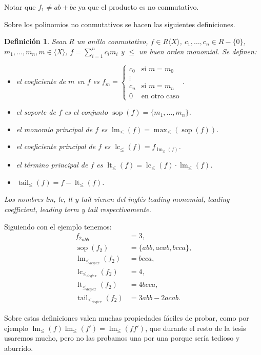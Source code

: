 \documentclass[12pt]{report}
\theoremstyle{customstyle}
\newtheorem{definition}[theorem]{Definición}
\theoremstyle{factstyle}
\DeclareMathOperator{\sop}{sop}
\DeclareMathOperator{\lm}{lm}
\DeclareMathOperator{\lc}{lc}
\DeclareMathOperator{\lt}{lt}
\DeclareMathOperator{\tail}{tail}
\begin{document}
\noindent Notar que $f_1 ≠ ab + bc$ ya que el producto es no conmutativo.

Sobre los polinomios no conmutativos se hacen las siguientes definiciones.

\begin{definition}\label{def:cosas de polinomios}
  Sean $R$ un anillo conmutativo, $f ∈ R⟨X⟩$, $c_1, …, c_n ∈ R - \{0\}$, $m_1, …, m_n, m ∈ ⟨X⟩$, $f = ∑_{i = 1}^n c_i m_i$ y $≤$ un buen orden monomial. Se definen:
  \begin{itemize}
    \item el coeficiente de $m$ en $f$ es $f_m = \begin{cases} c_0&\text{si }m = m_0 \\ ⋮ & \\ c_n&\text{si }m = m_n \\ 0&\text{en otro caso} \end{cases} $.
    \item el soporte de $f$ es el conjunto $\sop(f) = \{m_1, …, m_n\}$.
    \item el monomio principal de $f$ es $\lm_≤(f) = \max_≤(\sop(f))$.
    \item el coeficiente principal de $f$ es $\lc_≤(f) = f_{\lm_≤(f)}$.
    \item el término principal de $f$ es $\lt_≤(f) = \lc_≤(f) · \lm_≤(f)$.
    \item $\tail_≤(f) = f - \lt_≤(f)$.
  \end{itemize}

  Los nombres lm, lc, lt y tail vienen del inglés leading monomial, leading coefficient, leading term y tail respectivamente.
\end{definition}

Siguiendo con el ejemplo tenemos:
\begin{align*}
  {f_2}_{abb} &= 3 \text{,} \\
  \sop(f_2) &= \{abb, acab, bcca\} \text{,} \\
  \lm_{≤_{deglex}}(f_2) &= bcca \text{,} \\
  \lc_{≤_{deglex}}(f_2) &= 4 \text{,} \\
  \lt_{≤_{deglex}}(f_2) &= 4 bcca \text{,} \\
  \tail_{≤_{deglex}}(f_2) &= 3 abb - 2 acab \text{.}
\end{align*}

Sobre estas definiciones valen muchas propiedades fáciles de probar, como por ejemplo $\lm_≤(f) \lm_≤(f') = \lm_≤(f f')$, que durante el resto de la tesis usaremos mucho, pero no las probamos una por una porque sería tedioso y aburrido.
\end{document}
